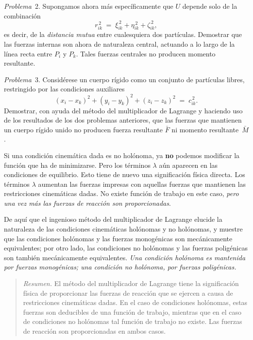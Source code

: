 \medskip
\noindent\textit{Problema}~2. Supongamos ahora más específicamente que $U$ depende solo de la combinación
\begin{equation}
r_{ik}^{\,2} \;=\; \xi_{ik}^{\,2} + \eta_{ik}^{\,2} + \zeta_{ik}^{\,2}, \tag{35.12}
\end{equation}
es decir, de la \emph{distancia mutua} entre cualesquiera dos partículas. Demostrar que las fuerzas internas son ahora de naturaleza central, actuando a lo largo de la línea recta entre $P_i$ y $P_k$. Tales fuerzas centrales no producen momento resultante.

\medskip
\noindent\textit{Problema}~3. Considérese un cuerpo rígido como un conjunto de partículas libres, restringido por las condiciones auxiliares
\begin{equation}
(x_i - x_k)^2 + (y_i - y_k)^2 + (z_i - z_k)^2 \;=\; c_{ik}^{\,2}. \tag{35.13}
\end{equation}
Demostrar, con ayuda del método del multiplicador de Lagrange y haciendo uso de los resultados de los dos problemas anteriores, que las fuerzas que mantienen un cuerpo rígido unido no producen fuerza resultante $\bar{F}$ ni momento resultante~$\bar{M}$.

\medskip
Si una condición cinemática dada es no holónoma, ya \textbf{no} podemos modificar la función que ha de minimizarse. Pero los términos $\lambda$ aún aparecen en las condiciones de equilibrio. Esto tiene de nuevo una significación física directa. Los términos $\lambda$ aumentan las fuerzas impresas con aquellas fuerzas que mantienen las restricciones cinemáticas dadas. No existe función de trabajo en este caso, \emph{pero una vez más las fuerzas de reacción son proporcionadas}.

De aquí que el ingenioso método del multiplicador de Lagrange elucide la naturaleza de las condiciones cinemáticas holónomas y no holónomas, y muestre que las condiciones holónomas y las fuerzas monogénicas son mecánicamente equivalentes; por otro lado, las condiciones no holónomas y las fuerzas poligénicas son también mecánicamente equivalentes. \emph{Una condición holónoma es mantenida por fuerzas monogénicas; una condición no holónoma, por fuerzas poligénicas.}

\begin{quote}
\textit{Resumen.} El método del multiplicador de Lagrange tiene la significación física de proporcionar las fuerzas de reacción que se ejercen a causa de restricciones cinemáticas dadas. En el caso de condiciones holónomas, estas fuerzas son deducibles de una función de trabajo, mientras que en el caso de condiciones no holónomas tal función de trabajo no existe. Las fuerzas de reacción son proporcionadas en ambos casos.
\end{quote}

